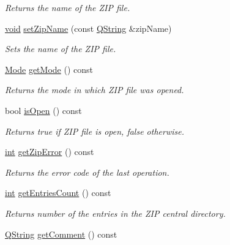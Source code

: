 \begin{DoxyCompactItemize}
\begin{DoxyCompactList}\small\item\em Returns the name of the Z\-I\-P file. \end{DoxyCompactList}\item 
\hyperlink{group___u_a_v_objects_plugin_ga444cf2ff3f0ecbe028adce838d373f5c}{void} \hyperlink{class_qua_zip_aa80b661de1262af905d1677dbcb008cc}{set\-Zip\-Name} (const \hyperlink{group___u_a_v_objects_plugin_gab9d252f49c333c94a72f97ce3105a32d}{Q\-String} \&zip\-Name)
\begin{DoxyCompactList}\small\item\em Sets the name of the Z\-I\-P file. \end{DoxyCompactList}\item 
\hyperlink{class_qua_zip_a47e28d4116ee716fdd6b431b821d0be4}{Mode} \hyperlink{class_qua_zip_a5ad835fba0d8fb5a71f54c1ba7a4af4f}{get\-Mode} () const 
\begin{DoxyCompactList}\small\item\em Returns the mode in which Z\-I\-P file was opened. \end{DoxyCompactList}\item 
bool \hyperlink{class_qua_zip_a5b869a9c0d4f49955b759592fec08888}{is\-Open} () const 
\begin{DoxyCompactList}\small\item\em Returns {\ttfamily true} if Z\-I\-P file is open, {\ttfamily false} otherwise. \end{DoxyCompactList}\item 
\hyperlink{ioapi_8h_a787fa3cf048117ba7123753c1e74fcd6}{int} \hyperlink{class_qua_zip_a28b91a6282ddd9382c96a069572c6fb4}{get\-Zip\-Error} () const 
\begin{DoxyCompactList}\small\item\em Returns the error code of the last operation. \end{DoxyCompactList}\item 
\hyperlink{ioapi_8h_a787fa3cf048117ba7123753c1e74fcd6}{int} \hyperlink{class_qua_zip_a2ea4bd1fca948637c35c2d2752bb5a80}{get\-Entries\-Count} () const 
\begin{DoxyCompactList}\small\item\em Returns number of the entries in the Z\-I\-P central directory. \end{DoxyCompactList}\item 
\hyperlink{group___u_a_v_objects_plugin_gab9d252f49c333c94a72f97ce3105a32d}{Q\-String} \hyperlink{class_qua_zip_ae55cfbf2296132df808c557b62433051}{get\-Comment} () const 

\end{DoxyCompactItemize}
